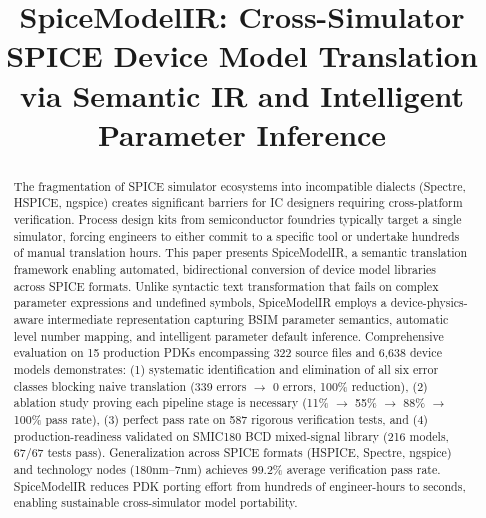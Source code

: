 \documentclass[conference]{IEEEtran}
\begin{document}
\title{SpiceModelIR: Cross-Simulator SPICE Device Model Translation via Semantic IR and Intelligent Parameter Inference}

\author{
}

\maketitle

\begin{abstract}
The fragmentation of SPICE simulator ecosystems into incompatible dialects (Spectre, HSPICE, ngspice) creates significant barriers for IC designers requiring cross-platform verification. Process design kits from semiconductor foundries typically target a single simulator, forcing engineers to either commit to a specific tool or undertake hundreds of manual translation hours. This paper presents SpiceModelIR, a semantic translation framework enabling automated, bidirectional conversion of device model libraries across SPICE formats. Unlike syntactic text transformation that fails on complex parameter expressions and undefined symbols, SpiceModelIR employs a device-physics-aware intermediate representation capturing BSIM parameter semantics, automatic level number mapping, and intelligent parameter default inference. Comprehensive evaluation on 15 production PDKs encompassing 322 source files and 6,638 device models demonstrates: (1) systematic identification and elimination of all six error classes blocking naive translation (339 errors $\rightarrow$ 0 errors, 100\% reduction), (2) ablation study proving each pipeline stage is necessary (11\% $\rightarrow$ 55\% $\rightarrow$ 88\% $\rightarrow$ 100\% pass rate), (3) perfect pass rate on 587 rigorous verification tests, and (4) production-readiness validated on SMIC180 BCD mixed-signal library (216 models, 67/67 tests pass). Generalization across SPICE formats (HSPICE, Spectre, ngspice) and technology nodes (180nm--7nm) achieves 99.2\% average verification pass rate. SpiceModelIR reduces PDK porting effort from hundreds of engineer-hours to seconds, enabling sustainable cross-simulator model portability.

\end{abstract}
\end{document}
